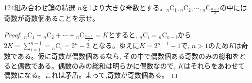 \begin{thm}{124}{}{組み合わせ論の精選}
$n$を1より大きな奇数とする。${}_{n}\mbox{C}_1,{}_{n}\mbox{C}_2,\cdots, {}_{n}\mbox{C}_{\frac{n-1}{2}}$の中には奇数が奇数個あることを示せ。 
\end{thm}

\begin{proof}
${}_{n}\mbox{C}_1+{}_{n}\mbox{C}_2+\cdots +{}_{n}\mbox{C}_{\frac{n-1}{2}}=K$とすると, ${}_n\mbox{C}_i={}_n\mbox{C}_{n-i}$から $2K=\displaystyle\sum_{i=1}^{n-1}={}_n\mbox{C}_i =2^n-2$ となる。ゆえに$K=2^{n-1}-1$で, $n>1$のため$K$は奇数である。仮に奇数が偶数個あるなら, その中で偶数個ある奇数のみの総和をとると偶数である。偶数のみの総和は明らかに偶数なので, $K$はそれらをあわせて偶数になる。これは矛盾。よって,奇数が奇数個ある。
\end{proof}


